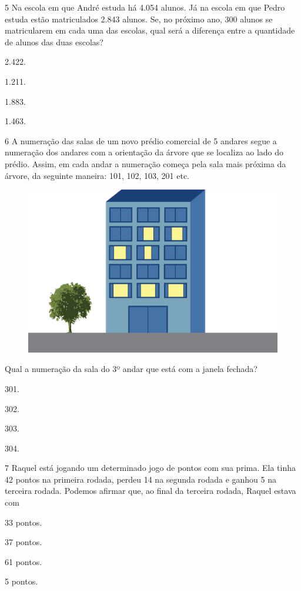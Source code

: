 \num{5} Na escola em que André estuda há 4.054 alunos. Já na escola em que
Pedro estuda estão matriculados 2.843 alunos. Se, no próximo ano, 300
alunos se matricularem em cada uma das escolas, qual será a diferença
entre a quantidade de alunos das duas escolas?

\begin{escolha}
\item
  2.422.
\item
  1.211.
\item
  1.883.
\item
  1.463.
\end{escolha}

\num{6} A numeração das salas de um novo prédio comercial de 5 andares segue a
numeração dos andares com a orientação da árvore que se localiza ao
lado do prédio. Assim, em cada andar a numeração começa pela sala mais
próxima da árvore, da seguinte maneira: 101, 102, 103, 201 etc.

\begin{figure}[htpb!]
\centering
\includegraphics[width=.5\textwidth]{./media/image93.png}
\end{figure}

Qual a numeração da sala do 3º andar que está com a janela fechada?

\begin{escolha}
\item
  301.
\item
  302.
\item
  303.
\item
  304.
\end{escolha}

\num{7} Raquel está jogando um determinado jogo de pontos com sua prima. Ela
tinha 42 pontos na primeira rodada, perdeu 14 na segunda rodada e ganhou
5 na terceira rodada. Podemos afirmar que, ao final da terceira rodada, Raquel estava com

\begin{escolha}
\item
  33 pontos.
\item
  37 pontos.
\item
  61 pontos.
\item
  5 pontos.
\end{escolha}

